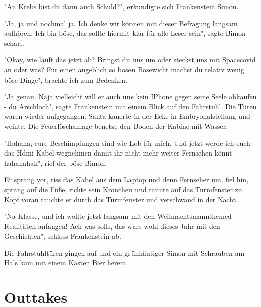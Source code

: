 \documentclass[ebook]{article}
\begin{document}
\begin{center}
"An Krebs bist du dann auch Schuld?", erkundigte sich Frankenstein
Simon.
\end{center}

\begin{center}
"Ja, ja und nochmal ja. Ich denke wir können mit dieser Befragung
langsam aufhören. Ich bin böse, das sollte hiermit klar für alle
Leser sein", sagte Bimon scharf.
\end{center}

\begin{center}
"Okay, wie läuft das jetzt ab? Bringst du uns um oder steckst uns
mit Spacecovid an oder was? Für einen angeblich so bösen Bösewicht
machst du relativ wenig böse Dinge", brachte ich zum Bedenken.
\end{center}

\begin{center}
"Ja genau. Naja vielleicht will er auch uns kein IPhone gegen seine
Seele abkaufen - du Arschloch", sagte Frankenstein mit einem Blick
auf den Fahrstuhl. Die Türen waren wieder aufgegangen. Santa kauerte
in der Ecke in Embryonalstellung und weinte. Die Feuerlöschanlage
benetze den Boden der Kabine mit Wasser.
\end{center}

\begin{center}
"Hahaha, eure Beschimpfungen sind wie Lob für mich. Und jetzt werde
ich euch das Hdmi Kabel wegnehmen damit ihr nicht mehr weiter
Fernsehen könnt hahahahah", rief der böse Bimon.
\end{center}

\noindent Er sprang vor, riss das Kabel aus dem Laptop und denn
Fernseher um, fiel hin, sprang auf die Füße, richte sein Krönchen
und rannte auf das Turmfenster zu. Kopf voran tauchte er durch das
Turmfenster und verschwand in der Nacht.

\begin{center}
"Na Klasse, und ich wollte jetzt langsam mit den
Weihnachtsmannthemed Realitäten anfangen! Ach was solls, das wars
wohl dieses Jahr mit den Geschichten", schloss Frankenstein ab.
\end{center}

\noindent Die Fahrstuhltüren gingen auf und ein grünhäutiger Simon
mit Schrauben am Hals kam mit einem Kasten Bier herein.
\section{Outtakes}
\label{sec:org341a73a}
\end{document}
